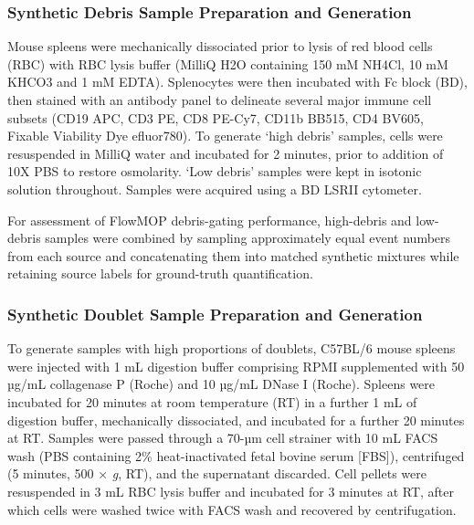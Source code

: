 \documentclass[ASNA]{latex/wiley/USG}
\begin{document}
\subsubsection{Synthetic Debris Sample Preparation and
Generation}\label{synthetic-debris-sample-preparation-and-generation}

Mouse spleens were mechanically dissociated prior to lysis of red blood
cells (RBC) with RBC lysis buffer (MilliQ H2O containing 150 mM NH4Cl,
10 mM KHCO3 and 1 mM EDTA). Splenocytes were then incubated with Fc
block (BD), then stained with an antibody panel to delineate several
major immune cell subsets (CD19 APC, CD3 PE, CD8 PE-Cy7, CD11b BB515,
CD4 BV605, Fixable Viability Dye efluor780). To generate `high debris'
samples, cells were resuspended in MilliQ water and incubated for 2
minutes, prior to addition of 10X PBS to restore osmolarity. `Low
debris' samples were kept in isotonic solution throughout. Samples were
acquired using a BD LSRII cytometer.

For assessment of FlowMOP debris-gating performance, high-debris and
low-debris samples were combined by sampling approximately equal event
numbers from each source and concatenating them into matched synthetic
mixtures while retaining source labels for ground-truth quantification.

\subsubsection{Synthetic Doublet Sample Preparation and
Generation}\label{synthetic-doublet-sample-preparation-and-generation}

To generate samples with high proportions of doublets, C57BL/6 mouse
spleens were injected with 1 mL digestion buffer comprising RPMI
supplemented with 50 µg/mL collagenase P (Roche) and 10 µg/mL DNase I
(Roche). Spleens were incubated for 20 minutes at room temperature (RT)
in a further 1 mL of digestion buffer, mechanically dissociated, and
incubated for a further 20 minutes at RT. Samples were passed through a
70-µm cell strainer with 10 mL FACS wash (PBS containing 2\%
heat-inactivated fetal bovine serum {[}FBS{]}), centrifuged (5 minutes,
500 × \emph{g}, RT), and the supernatant discarded. Cell pellets were
resuspended in 3 mL RBC lysis buffer and incubated for 3 minutes at RT,
after which cells were washed twice with FACS wash and recovered by
centrifugation.
\end{document}
